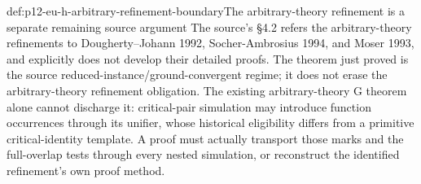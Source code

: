 \begin{proofboundary}{def:p12-eu-h-arbitrary-refinement-boundary}{The arbitrary-theory refinement is a separate remaining source argument}
The source's \S4.2 refers the arbitrary-theory refinements to
Dougherty--Johann 1992, Socher-Ambrosius 1994, and Moser 1993, and
explicitly does not develop their detailed proofs. The theorem just
proved is the source reduced-instance/ground-convergent regime; it
does not erase the arbitrary-theory refinement obligation.
The existing arbitrary-theory G theorem alone cannot discharge it:
critical-pair simulation may introduce function occurrences through
its unifier, whose historical eligibility differs from a primitive
critical-identity template. A proof must actually transport those
marks and the full-overlap tests through every nested simulation,
or reconstruct the identified refinement's own proof method.
\cite[\S4.2, p.~495]{BaaderSnyder2001}
\end{proofboundary}

